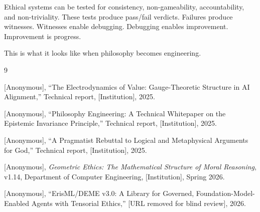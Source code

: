 \documentclass[12pt]{article}
\begin{document}
Ethical systems can be tested for consistency, non-gameability, accountability, and
non-triviality. These tests produce pass/fail verdicts. Failures produce witnesses.
Witnesses enable debugging. Debugging enables improvement. Improvement is
progress.

This is what it looks like when philosophy becomes engineering.

\begin{thebibliography}{9}

[Anonymous], ``The Electrodynamics of Value: Gauge-Theoretic Structure in AI
Alignment,'' Technical report, [Institution], 2025.

[Anonymous], ``Philosophy Engineering: A Technical Whitepaper on the Epistemic
Invariance Principle,'' Technical report, [Institution], 2025.

[Anonymous], ``A Pragmatist Rebuttal to Logical and Metaphysical Arguments for God,''
Technical report, [Institution], 2025.

[Anonymous], \emph{Geometric Ethics: The Mathematical Structure of Moral Reasoning}, v1.14, Department of Computer Engineering, [Institution], Spring 2026.

[Anonymous], ``ErisML/DEME v3.0: A Library for Governed, Foundation-Model-Enabled Agents with Tensorial Ethics,'' [URL removed for blind review], 2026.

\end{thebibliography}
\end{document}
